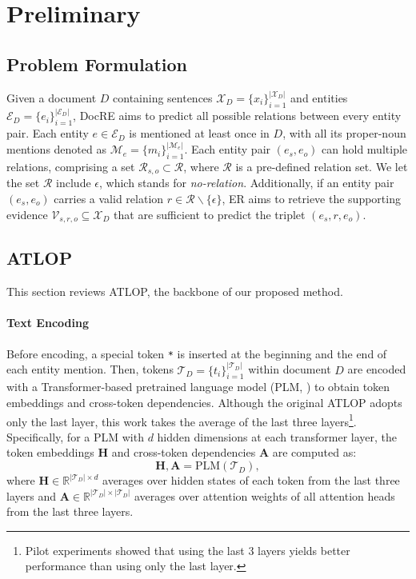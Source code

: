 \documentclass[11pt]{article}
\newcommand{\setR}{\mathcal{R}}
\newcommand{\setX}{\mathcal{X}}
\newcommand{\setE}{\mathcal{E}}
\newcommand{\setM}{\mathcal{M}}
\newcommand{\setV}{\mathcal{V}}
\newcommand{\setT}{\mathcal{T}}
\begin{document}
\section{Preliminary}
\subsection{Problem Formulation}

Given a document $D$ containing sentences $\setX_D = \{x_i\}_{i=1}^{|\setX_D|}$ and entities $\setE_D = \{e_i\}_{i=1}^{|\setE_D|}$, DocRE aims to predict all possible relations between every entity pair. 
Each entity $e\in \setE_D$ is mentioned at least once in $D$, with all its proper-noun mentions denoted as $\setM_e=\{m_i\}_{i=1}^{|\mathcal{M}_e|}$.
Each entity pair $(e_s, e_o)$ can hold multiple relations, comprising a set $\setR_{s,o} \subset \setR$, where $\setR$ is a pre-defined relation set.
We let the set $\setR$ include $\epsilon$, which stands for \textit{no-relation}.
Additionally, if an entity pair $(e_s, e_o)$ carries a valid relation $r\in \setR \backslash \{\epsilon\}$, ER aims to retrieve the supporting evidence $\setV_{s,r,o} \subseteq \setX_D$ that are sufficient to predict the triplet $(e_s, r, e_o)$. 


\subsection{ATLOP}
\label{sec:model}
This section reviews ATLOP, the backbone of our proposed method.
\paragraph{Text Encoding} Before encoding, a special token \texttt{*} is inserted at the beginning and the end of each entity mention.
Then, tokens $\setT_D=\{t_i\}_{i=1}^{|\setT_D|}$ within document $D$ are encoded with a Transformer-based pretrained language model (PLM, \citealp{NIPS2017attention}) to obtain token embeddings and cross-token dependencies.
Although the original ATLOP adopts only the last layer, this work takes the average of the last three layers\footnote{Pilot experiments showed that using the last 3 layers yields better performance than using only the last layer.}.
Specifically, for a PLM with $d$ hidden dimensions at each transformer layer, the token embeddings $\bm{H}$ and cross-token dependencies $\bm{A}$ are computed as:
\begin{equation}
    \label{eq:text_enc}
    \bm{H}, \bm{A} = \textrm{PLM}(\setT_D), 
\end{equation}
where $\bm{H} \in \mathbb{R}^{|\setT_D| \times d}$ averages over hidden states of each token from the last three layers and $\bm{A} \in \mathbb{R}^{|\setT_D| \times |\setT_D|}$ averages over attention weights of all attention heads from the last three layers.
\end{document}
